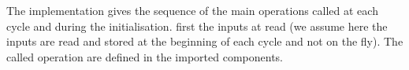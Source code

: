 
\vspace*{8mm}

The implementation gives the sequence of the main operations called at each cycle and during the initialisation. first the inputs at read (we assume here the inputs are read  and stored at the beginning of each cycle and not on the fly). The called operation are defined in the imported components.


